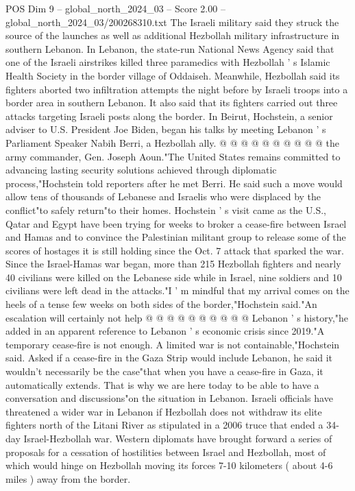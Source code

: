 \begin{textsample}{POS Dim 9 – global\_north\_2024\_03 – Score 2.00 – global\_north\_2024\_03/200268310.txt}
The Israeli military said they struck the source of the launches as well as additional Hezbollah military infrastructure in southern Lebanon.
In Lebanon, the state-run National News Agency said that one of the Israeli airstrikes killed three paramedics with Hezbollah ' s Islamic Health Society in the border village of Oddaiseh.
Meanwhile, Hezbollah said its fighters aborted two infiltration attempts the night before by Israeli troops into a border area in southern Lebanon.
It also said that its fighters carried out three attacks targeting Israeli posts along the border.
In Beirut, Hochstein, a senior adviser to U.S.
President Joe Biden, began his talks by meeting Lebanon ' s Parliament Speaker Nabih Berri, a Hezbollah ally. @ @ @ @ @ @ @ @ @ @ the army commander, Gen.
Joseph Aoun."The United States remains committed to advancing lasting security solutions achieved through diplomatic process,"Hochstein told reporters after he met Berri.
He said such a move would allow tens of thousands of Lebanese and Israelis who were displaced by the conflict"to safely return"to their homes.
Hochstein ' s visit came as the U.S., Qatar and Egypt have been trying for weeks to broker a cease-fire between Israel and Hamas and to convince the Palestinian militant group to release some of the scores of hostages it is still holding since the Oct. 7 attack that sparked the war.
Since the Israel-Hamas war began, more than 215 Hezbollah fighters and nearly 40 civilians were killed on the Lebanese side while in Israel, nine soldiers and 10 civilians were left dead in the attacks."I ' m mindful that my arrival comes on the heels of a tense few weeks on both sides of the border,"Hochstein said."An escalation will certainly not help @ @ @ @ @ @ @ @ @ @ Lebanon ' s history,"he added in an apparent reference to Lebanon ' s economic crisis since 2019."A temporary cease-fire is not enough.
A limited war is not containable,"Hochstein said.
Asked if a cease-fire in the Gaza Strip would include Lebanon, he said it wouldn't necessarily be the case"that when you have a cease-fire in Gaza, it automatically extends.
That is why we are here today to be able to have a conversation and discussions"on the situation in Lebanon.
Israeli officials have threatened a wider war in Lebanon if Hezbollah does not withdraw its elite fighters north of the Litani River as stipulated in a 2006 truce that ended a 34-day Israel-Hezbollah war.
Western diplomats have brought forward a series of proposals for a cessation of hostilities between Israel and Hezbollah, most of which would hinge on Hezbollah moving its forces 7-10 kilometers ( about 4-6 miles ) away from the border.

\end{textsample}
